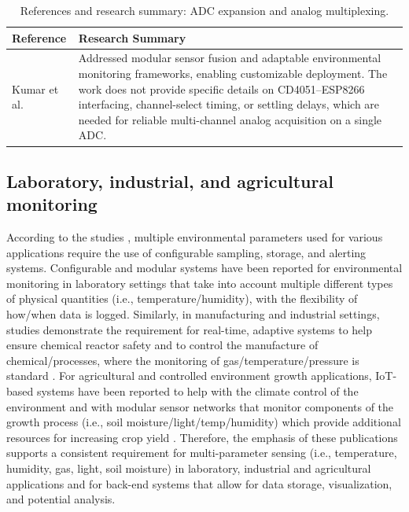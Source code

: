 \documentclass[journal,onecolumn]{IEEEtran}
\begin{document}
\begin{table}[h]
\centering
\caption{References and research summary: ADC expansion and analog multiplexing.}
\label{tab:lit-adc}
\small
\begin{tabular}{|p{}|p{}|}
\hline
\textbf{Reference} & \textbf{Research Summary} \\
\hline
Kumar et al. \cite{modularsensors2022} & Addressed modular sensor fusion and adaptable environmental monitoring frameworks, enabling customizable deployment. The work does not provide specific details on CD4051--ESP8266 interfacing, channel-select timing, or settling delays, which are needed for reliable multi-channel analog acquisition on a single ADC. \\
\hline
\end{tabular}
\end{table}

\subsection{Laboratory, industrial, and agricultural monitoring}
According to the studies \cite{labmonitoring2020,precisionlab2021}, multiple environmental parameters used for various applications require the use of configurable sampling, storage, and alerting systems. Configurable and modular systems have been reported for environmental monitoring in laboratory settings that take into account multiple different types of physical quantities (i.e., temperature/humidity), with the flexibility of how/when data is logged. Similarly, in manufacturing and industrial settings, studies \cite{reactorsafety2022,processmonitoring2023} demonstrate the requirement for real-time, adaptive systems to help ensure chemical reactor safety and to control the manufacture of chemical/processes, where the monitoring of gas/temperature/pressure is standard \cite{industrialiot2020}. For agricultural and controlled environment growth applications, IoT-based systems have been reported to help with the climate control of the environment and with modular sensor networks that monitor components of the growth process (i.e., soil moisture/light/temp/humidity) which provide additional resources for increasing crop yield \cite{greenhouseiot2019, smartgreenhouse2021}. Therefore, the emphasis of these publications supports a consistent requirement for multi-parameter sensing (i.e., temperature, humidity, gas, light, soil moisture) in laboratory, industrial and agricultural applications and for back-end systems that allow for data storage, visualization, and potential analysis.
\end{document}
